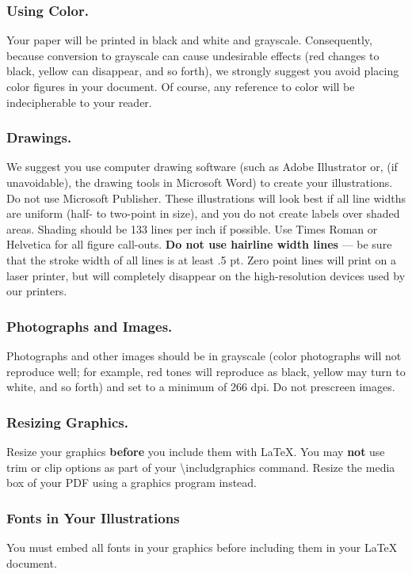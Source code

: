 \documentclass[letterpaper]{article}
\begin{document}
\subsubsection{Using Color.}
Your paper will be printed in black and white and grayscale. Consequently, because conversion to grayscale can cause undesirable effects (red changes to black, yellow can disappear, and so forth), we strongly suggest you avoid placing color figures in your document. Of course, any reference to color will be indecipherable to your reader. 

\subsubsection{Drawings.}
We suggest you use computer drawing software (such as Adobe Illustrator or, (if unavoidable), the drawing tools in Microsoft Word) to create your illustrations. Do not use Microsoft Publisher. These illustrations will look best if all line widths are uniform (half- to two-point in size), and you do not create labels over shaded areas. Shading should be 133 lines per inch if possible. Use Times Roman or Helvetica for all figure call-outs. \textbf{Do not use hairline width lines} --- be sure that the stroke width of all lines is at least .5 pt. Zero point lines will print on a laser printer, but will completely disappear on the high-resolution devices used by our printers.

\subsubsection{Photographs and Images.}
Photographs and other images should be in grayscale (color photographs will not reproduce well; for example, red tones will reproduce as black, yellow may turn to white, and so forth) and set to a minimum of 266 dpi. Do not prescreen images.

\subsubsection{Resizing Graphics.}
Resize your graphics \textbf{before} you include them with LaTeX. You may \textbf{not} use trim or clip options as part of your \textbackslash includgraphics command. Resize the media box of your PDF using a graphics program instead. 

\subsubsection{Fonts in Your Illustrations}
You must embed all fonts in your graphics before including them in your LaTeX document.
\end{document}
